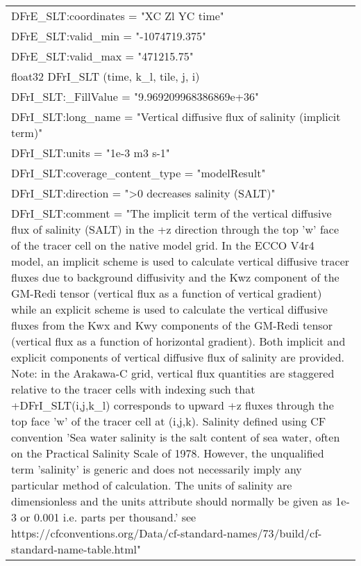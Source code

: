 \begin{longtable}{|p{\textwidth}|}
\hspace{0.5cm}\hspace{0.5cm}DFrE\_SLT:coordinates = "XC Zl YC time"\\
\hspace{0.5cm}\hspace{0.5cm}DFrE\_SLT:valid\_min = "-1074719.375"\\
\hspace{0.5cm}\hspace{0.5cm}DFrE\_SLT:valid\_max = "471215.75"\\
\hspace{0.5cm}float32 DFrI\_SLT (time, k\_l, tile, j, i)\\
\hspace{0.5cm}\hspace{0.5cm}DFrI\_SLT:\_FillValue = "9.969209968386869e+36"\\
\hspace{0.5cm}\hspace{0.5cm}DFrI\_SLT:long\_name = "Vertical diffusive flux of salinity (implicit term)"\\
\hspace{0.5cm}\hspace{0.5cm}DFrI\_SLT:units = "1e-3 m3 s-1"\\
\hspace{0.5cm}\hspace{0.5cm}DFrI\_SLT:coverage\_content\_type = "modelResult"\\
\hspace{0.5cm}\hspace{0.5cm}DFrI\_SLT:direction = ">0 decreases salinity (SALT)"\\
\hspace{0.5cm}\hspace{0.5cm}DFrI\_SLT:comment = "The implicit term of the vertical diffusive flux of salinity (SALT) in the +z direction through the top 'w' face of the tracer cell on the native model grid. In the ECCO V4r4 model, an implicit scheme is used to calculate vertical diffusive tracer fluxes due to background diffusivity and the Kwz component of the GM-Redi tensor (vertical flux as a function of vertical gradient) while an explicit scheme is used to calculate the vertical diffusive fluxes from the Kwx and Kwy components of the GM-Redi tensor (vertical flux as a function of horizontal gradient). Both implicit and explicit components of vertical diffusive flux of salinity are provided. Note: in the Arakawa-C grid, vertical flux quantities are staggered relative to the tracer cells with indexing such that +DFrI\_SLT(i,j,k\_l) corresponds to upward +z fluxes through the top face 'w' of the tracer cell at (i,j,k). Salinity defined using CF convention 'Sea water salinity is the salt content of sea water, often on the Practical Salinity Scale of 1978. However, the unqualified term 'salinity' is generic and does not necessarily imply any particular method of calculation. The units of salinity are dimensionless and the units attribute should normally be given as 1e-3 or 0.001 i.e. parts per thousand.' see https://cfconventions.org/Data/cf-standard-names/73/build/cf-standard-name-table.html"\\

\end{longtable}
